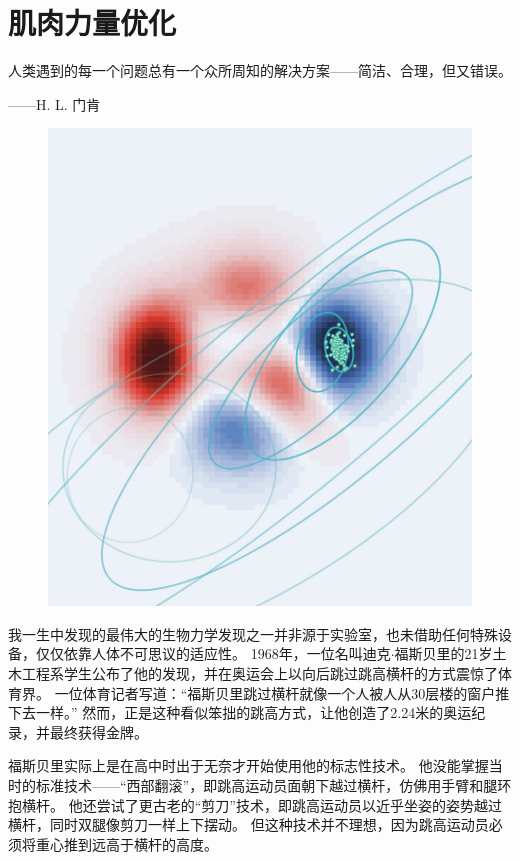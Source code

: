 \chapter{肌肉力量优化} \label{chap:chap9}

人类遇到的每一个问题总有一个众所周知的解决方案——简洁、合理，但又错误。
\begin{flushright}
	——H. L. 门肯
\end{flushright}


\begin{figure}[!htb]
	\centering
	\includegraphics[width=1.0\linewidth]{chap9/9_0}
	\caption*{ \label{fig:9_0}}
\end{figure}


我一生中发现的最伟大的生物力学发现之一并非源于实验室，也未借助任何特殊设备，仅仅依靠人体不可思议的适应性。
1968年，一位名叫迪克$\cdot$福斯贝里的21岁土木工程系学生公布了他的发现，并在奥运会上以向后跳过跳高横杆的方式震惊了体育界。
一位体育记者写道：“福斯贝里跳过横杆就像一个人被人从30层楼的窗户推下去一样。”
然而，正是这种看似笨拙的跳高方式，让他创造了2.24米的奥运纪录，并最终获得金牌。


福斯贝里实际上是在高中时出于无奈才开始使用他的标志性技术。
他没能掌握当时的标准技术——“西部翻滚”，即跳高运动员面朝下越过横杆，仿佛用手臂和腿环抱横杆。
他还尝试了更古老的“剪刀”技术，即跳高运动员以近乎坐姿的姿势越过横杆，同时双腿像剪刀一样上下摆动。
但这种技术并不理想，因为跳高运动员必须将重心推到远高于横杆的高度。


